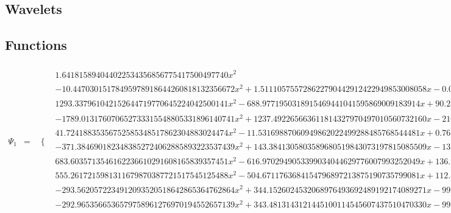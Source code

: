 \documentclass{article}
\begin{document}
 \begin{landscape}
\section{Wavelets}
\subsection{Functions}
 \begin{eqnarray*}
\Psi_1 & = & \begin{array}{cc}
 \{ & 
\begin{array}{cc}
 1.641815894044022534356856775417500497740 x^2 & x\geq 0\land x<\frac{1}{16} \\
 -10.44703015178495978918644260818132356672 x^2+1.511105755728622790442912422949853008058 x-0.04722205486651946220134101321718290650180 & x\geq \frac{1}{16}\land x<\frac{1}{8} \\
 1293.337961042152644719770645224042500141 x^2-688.9771950318915469441041595869009183914 x+90.28975992478263374995683953767116717749 & x\geq \frac{1}{4}\land x<\frac{5}{16} \\
 -1789.013176070652733315548805331896140741 x^2+1237.492265663611814327970497010560732160 x-210.7210933088897664488048255556822157211 & x\geq \frac{5}{16}\land x<\frac{3}{8} \\
 41.72418835356752585348517862304883024474 x^2-11.53169887060949862022499288485768544481 x+0.7679532342796131259654030685207882468023 & x\geq \frac{1}{8}\land x<\frac{3}{16} \\
 -371.3846901823483852724062885893223537439 x^2+143.3841305803589680519843073197815085509 x-13.75540577674868062455421882566413619030 & x\geq \frac{3}{16}\land x<\frac{1}{4} \\
 683.6035713546162236610291608165839357451 x^2-616.9702949053399034044629776007993252049 x+136.9906367977886806260264509339477950347 & x\geq \frac{3}{8}\land x<\frac{7}{16} \\
 555.2617215981311679870387721517545125488 x^2-504.6711763684154796897213875190735799081 x+112.4252046178364629384267281035702882511 & x\geq \frac{7}{16}\land x<\frac{1}{2} \\
 -293.5620572234912093520518642865364762864 x^2+344.1526024532068976493692489192174089271 x-99.78074008756913139634593100600245895773 & x\geq \frac{1}{2}\land x<\frac{9}{16} \\
 -292.9653566536579758961276970194552657139 x^2+343.4813143121445100114545607437510470330 x-99.59194029789533487318242495665254467502 & x\geq \frac{9}{16}\land x<\frac{5}{8} \\

\end{array}
\end{array}
\end{eqnarray*}
\end{landscape}
\end{document}
